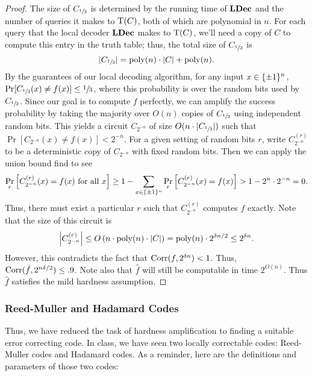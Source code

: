 \documentclass[11pt]{article}
\begin{document}
\begin{proof}
    The size of $C_{\sfrac{1}{3}}$ is determined by the running time of $\text{\textbf{LDec}}$ and the number of queries it makes to $\mathrm{T}(C)$, both of which are polynomial in $n$. For each query that the local decoder $\text{\textbf{LDec}}$ makes to $\mathrm{T}(C)$, we'll need a copy of $C$ to compute this entry in the truth table; thus, the total size of $C_{\sfrac{1}{3}}$ is 
    \begin{equation*}
        |C_{\sfrac{1}{3}}| = \mathrm{poly}(n) \cdot |C| + \mathrm{poly}(n).
    \end{equation*}
    By the guarantees of our local decoding algorithm, for any input $x \in \{\pm 1\}^n$, $\Pr[C_{\sfrac{1}{3}}(x) \neq f(x)] \leq \sfrac{1}{3}$, where this probability is over the random bits used by $C_{\sfrac{1}{3}}$. Since our goal is to compute $f$ perfectly, we can amplify the success probability by taking the majority over $O(n)$ copies of $C_{\sfrac{1}{3}}$ using independent random bits. This yields a circuit $C_{2^{-n}}$ of size $O(n \cdot |C_{\sfrac{1}{3}}|)$ such that $\Pr[C_{2^{-n}}(x) \neq f(x)] < 2^{-n}$. For a given setting of random bits $r$, write $C_{2^{-n}}^{(r)}$ to be a deterministic copy of $C_{2^{-n}}$ with fixed random bits. Then we can apply the union bound find to see
    \begin{equation*}
        \Pr_r\left[C^{(r)}_{2^{-n}}(x) = f(x) \text{ for all $x$}\right] \geq 1 - \sum_{x \in \{\pm 1\}^n} \Pr_r\left[C^{(r)}_{2^{-n}}(x) = f(x)\right] > 1 - 2^{n} \cdot 2^{-n} = 0.
    \end{equation*}
    Thus, there must exist a particular $r$ such that $C^{(r)}_{2^{-n}}$ computes $f$ exactly. Note that the size of this circuit is 
    \begin{equation*}
        \left|C^{(r)}_{2^{-n}}\right| \leq O\left(n \cdot \mathrm{poly}(n) \cdot |C|\right) = \mathrm{poly}(n) \cdot 2^{\delta n / 2} \leq 2^{\delta n}.
    \end{equation*}
    However, this contradicts the fact that $\mathrm{Corr}(f, 2^{\delta n}) < 1$. Thus, $\mathrm{Corr}(\hat{f}, 2^{n\delta / 2}) \leq .9$. Note also that $\hat{f}$ will still be computable in time $2^{O(n)}$. Thus $\hat{f}$ satisfies the mild hardness assumption.
\end{proof}

\subsubsection{Reed-Muller and Hadamard Codes}

Thus, we have reduced the task of hardness amplification to finding a suitable error correcting code. In class, we have seen two locally correctable codes: Reed-Muller codes and Hadamard codes. As a reminder, here are the definitions and parameters of those two codes:
\end{document}
